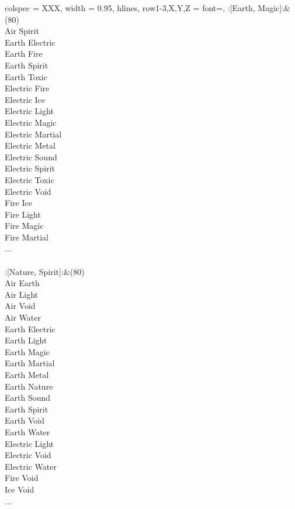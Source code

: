 \begin{longtblr}[
	caption = {2v2 Defending Weak},
	label = {2v2-Defending-Weak},
]{
	colspec = {XXX}, width = 0.95\linewidth,
	hlines,
	row{1-3,X,Y,Z} = {font=\bfseries},
}
	:[Earth, Magic]:&{(80)\\
	Air Spirit \\
	Earth Electric \\
	Earth Fire \\
	Earth Spirit \\
	Earth Toxic \\
	Electric Fire \\
	Electric Ice \\
	Electric Light \\
	Electric Magic \\
	Electric Martial \\
	Electric Metal \\
	Electric Sound \\
	Electric Spirit \\
	Electric Toxic \\
	Electric Void \\
	Fire Ice \\
	Fire Light \\
	Fire Magic \\
	Fire Martial \\
	...\\
	}\\

	:[Nature, Spirit]:&{(80)\\
	Air Earth \\
	Air Light \\
	Air Void \\
	Air Water \\
	Earth Electric \\
	Earth Light \\
	Earth Magic \\
	Earth Martial \\
	Earth Metal \\
	Earth Nature \\
	Earth Sound \\
	Earth Spirit \\
	Earth Void \\
	Earth Water \\
	Electric Light \\
	Electric Void \\
	Electric Water \\
	Fire Void \\
	Ice Void \\
	...\\
	}\\


\end{longtblr}
